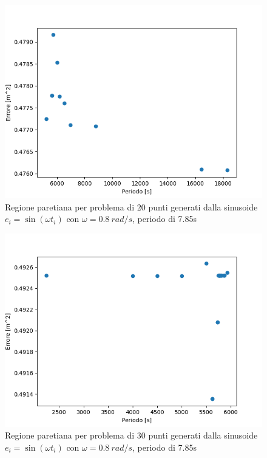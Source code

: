 \documentclass[a4paper,12pt]{report}
\begin{document}
\begin{figure}[H]
  \centering
  \includegraphics[scale=0.67]{img/puls08/init_20.png}
  \caption{Regione paretiana per problema di 20 punti generati dalla sinusoide \newline $e_i = \sin(\omega t_i)$ con $\omega = 0.8~rad/s$, periodo di 7.85s}
  \label{fig:init_08_20}
\end{figure}

\begin{figure}[H]
  \centering
  \includegraphics[scale=0.67]{img/puls08/init_30.png}
  \caption{Regione paretiana per problema di 30 punti generati dalla sinusoide \newline $e_i = \sin(\omega t_i)$ con $\omega = 0.8~rad/s$, periodo di 7.85s}
  \label{fig:init_08_30}
\end{figure}
\end{document}
